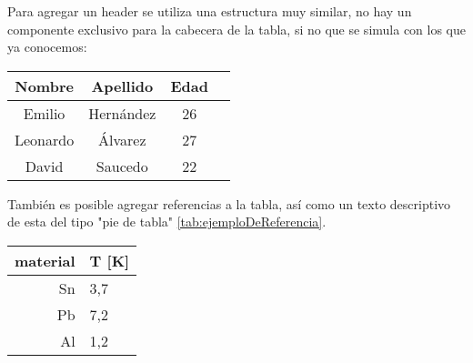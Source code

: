 \documentclass[12pt,letterpaper,oneside]{article}
\begin{document}
\begin{multicols}{2}

Para agregar un header se utiliza una estructura muy similar, no hay un componente exclusivo para la cabecera de la tabla, si no que se simula con los que ya conocemos:



\begin{center}
 \begin{tabular}{||c | c | c | c||} 
 
 \hline
   Nombre & Apellido & Edad  \\ [0.5ex] 
 \hline\hline
 Emilio & Hernández & 26  \\ 
 \hline
 Leonardo & Álvarez & 27 \\
 \hline
 David & Saucedo & 22 \\
 \hline
\end{tabular}
\end{center}


También es posible agregar referencias a la tabla, así como un texto descriptivo de esta del tipo "pie de tabla" \ref{tab:ejemploDeReferencia}.

\begin{center}
  
  \begin{tabular}{r | l}
    material  & T [K]\\
    \hline
    Sn & 3,7 \\
    Pb & 7,2 \\
    Al & 1,2\\
  \end{tabular}
\end{center}



\end{multicols}
\end{document}

